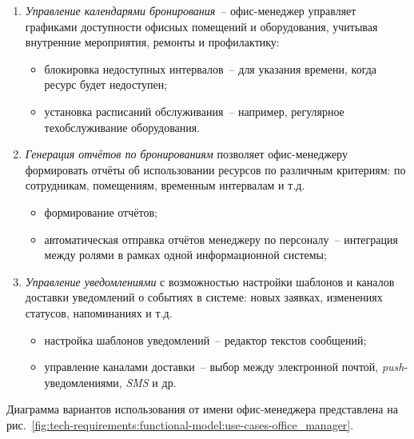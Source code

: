 \begin{enumerate}
    \item \textit{Управление календарями бронирования}~-- офис-менеджер управляет графиками доступности офисных помещений и оборудования, учитывая внутренние мероприятия, ремонты и профилактику:
    \begin{itemize}
        \item блокировка недоступных интервалов~-- для указания времени, когда ресурс будет недоступен;
        \item установка расписаний обслуживания~-- например, регулярное техобслуживание оборудования.
    \end{itemize}

    \item \textit{Генерация отчётов по бронированиям} позволяет офис-менеджеру формировать отчёты об использовании ресурсов по различным критериям: по сотрудникам, помещениям, временным интервалам и т.д.
    \begin{itemize}
        \item формирование отчётов;
        \item автоматическая отправка отчётов менеджеру по персоналу~-- интеграция между ролями в рамках одной информационной системы;
    \end{itemize}

    \item \textit{Управление уведомлениями} с возможностью настройки шаблонов и каналов доставки уведомлений о событиях в системе: новых заявках, изменениях статусов, напоминаниях и т.д.
    \begin{itemize}
        \item настройка шаблонов уведомлений~-- редактор текстов сообщений;
        \item управление каналами доставки~-- выбор между электронной почтой, \textit{push}-уведомлениями, \textit{SMS} и др.
    \end{itemize}
\end{enumerate}

Диаграмма вариантов использования от имени офис-менеджера представлена на рис.~\ref{fig:tech-requirements:functional-model:use-cases-office_manager}.

